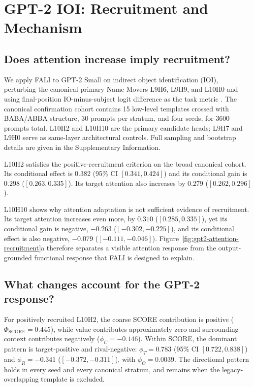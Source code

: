 \section{GPT-2 IOI: Recruitment and Mechanism}\label{sec:gpt2}

\subsection{Does attention increase imply recruitment?}\label{sec:gpt2-functional}

We apply FALI to GPT-2 Small on indirect object identification (IOI), perturbing the canonical primary Name Movers L9H6, L9H9, and L10H0 and using final-position IO-minus-subject logit difference as the task metric \citep{wang2023ioi}. The canonical confirmation cohort contains 15 low-level templates crossed with BABA/ABBA structure, 30 prompts per stratum, and four seeds, for 3600 prompts total. L10H2 and L10H10 are the primary candidate heads; L9H7 and L9H0 serve as same-layer architectural controls. Full sampling and bootstrap details are given in the Supplementary Information.

L10H2 satisfies the positive-recruitment criterion on the broad canonical cohort. Its conditional effect is $0.382$ (95\% CI $[0.341,0.424]$) and its conditional gain is $0.298$ ($[0.263,0.335]$). Its target attention also increases by $0.279$ ($[0.262,0.296]$).

L10H10 shows why attention adaptation is not sufficient evidence of recruitment. Its target attention increases even more, by $0.310$ ($[0.285,0.335]$), yet its conditional gain is negative, $-0.263$ ($[-0.302,-0.225]$), and its conditional effect is also negative, $-0.079$ ($[-0.111,-0.046]$). Figure~\ref{fig:gpt2-attention-recruitment}a therefore separates a visible attention response from the output-grounded functional response that FALI is designed to explain.



\subsection{What changes account for the GPT-2 response?}\label{sec:gpt2-fali}

For positively recruited L10H2, the coarse SCORE contribution is positive ($\Phi_{\mathrm{SCORE}}=0.445$), while value contributes approximately zero and surrounding context contributes negatively ($\phi_C=-0.146$). Within SCORE, the dominant pattern is target-positive and rival-negative: $\phi_T=0.783$ (95\% CI $[0.722,0.838]$) and $\phi_R=-0.341$ ($[-0.372,-0.311]$), with $\phi_O=0.0039$. The directional pattern holds in every seed and every canonical stratum, and remains when the legacy-overlapping template is excluded.

